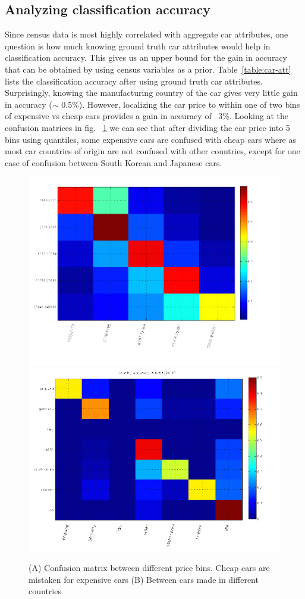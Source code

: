 \documentclass[10pt,twocolumn,letterpaper]{article}
\begin{document}
\subsection{Analyzing classification accuracy}
Since census data is most highly correlated with aggregate car attributes, one question is how much knowing ground truth car attributes would help in classification accuracy. This gives us an upper bound for the gain in accuracy that can be obtained by using census variables as a prior. Table~\ref{table:car-att} lists the classification accuracy after using ground truth car attributes. Surprisingly, knowing the manufacturing country of the car gives very little gain in accuracy (\(\sim\) 0.5\%). However, localizing the car price to within one of two bins of expensive vs cheap cars provides a gain in accuracy of ~3\%. Looking at the confusion matrices in fig. ~\ref{fig:fg-confusion} we can see that after dividing the car price into 5 bins using quantiles, some expensive cars are confused with cheap cars where as most car countries of origin are not confused with other countries, except for one case of confusion between South Korean and Japanese cars.

\begin{figure}[t]
\begin{center}
   \includegraphics[width=0.4\linewidth]{img/confusion_price5.png}
   \hspace{0.1\linewidth}
   \includegraphics[width=0.4\linewidth]{img/confusion_country.png}
\end{center}
   \caption{(A) Confusion matrix between different price bins. Cheap cars are mistaken for expensive cars (B) Between cars made in different countries}
\label{fig:fg-confusion}
\end{figure}
\end{document}
